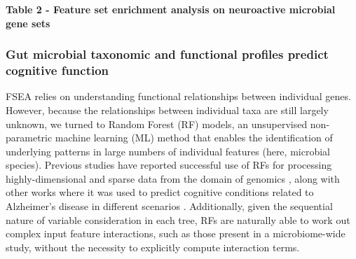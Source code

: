 \documentclass[a4paper]{article}
\begin{document}
\textbf{Table 2 - Feature set enrichment analysis on neuroactive microbial gene sets}

\subsubsection{Gut microbial taxonomic and functional profiles predict cognitive function}

FSEA relies on understanding functional relationships between individual
genes. However, because the relationships between individual taxa are
still largely unknown, we turned to Random Forest (RF) models, an
unsupervised non-parametric machine learning (ML) method that enables
the identification of underlying patterns in large numbers of individual
features (here, microbial species). Previous studies have reported
successful use of RFs for processing highly-dimensional and sparse data
from the domain of genomics
\citep{amaratungaEnrichedRandomForests2008,brieucPracticalIntroductionRandom2018,chenRandomForestsGenomic2012,franzosaGutMicrobiomeStructure2019,stephanRandomForestApproach2015},
along with other works where it was used
to predict cognitive conditions related to Alzheimer's disease in
different scenarios
\citep{ardekaniPredictionIncipientAlzheimer2017,velazquezRandomForestModel2021}.
Additionally, given the sequential
nature of variable consideration in each tree, RFs are naturally able to
work out complex input feature interactions, such as those present in a
microbiome-wide study, without the necessity to explicitly compute
interaction terms.
\end{document}

